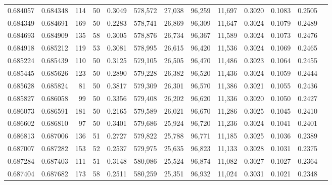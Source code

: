 \begin{tabular}{rrrrrrrrrrrrr}
0.684057 & 0.684348 &   114 &  50 &                                     0.3049 & 578,572 &  27,038 &  96,259 &  11,697 & 0.3020 & 0.1083 & 0.2505 \\
0.684349 & 0.684691 &   169 &  50 &                                     0.2283 & 578,741 &  26,869 &  96,309 &  11,647 & 0.3024 & 0.1079 & 0.2489 \\
0.684693 & 0.684909 &   135 &  58 &                                     0.3005 & 578,876 &  26,734 &  96,367 &  11,589 & 0.3024 & 0.1073 & 0.2476 \\
0.684918 & 0.685212 &   119 &  53 &                                     0.3081 & 578,995 &  26,615 &  96,420 &  11,536 & 0.3024 & 0.1069 & 0.2465 \\
0.685224 & 0.685439 &   110 &  50 &                                     0.3125 & 579,105 &  26,505 &  96,470 &  11,486 & 0.3023 & 0.1064 & 0.2455 \\
0.685445 & 0.685626 &   123 &  50 &                                     0.2890 & 579,228 &  26,382 &  96,520 &  11,436 & 0.3024 & 0.1059 & 0.2444 \\
0.685628 & 0.685824 &    81 &  50 &                                     0.3817 & 579,309 &  26,301 &  96,570 &  11,386 & 0.3021 & 0.1055 & 0.2436 \\
0.685827 & 0.686058 &    99 &  50 &                                     0.3356 & 579,408 &  26,202 &  96,620 &  11,336 & 0.3020 & 0.1050 & 0.2427 \\
0.686073 & 0.686591 &   181 &  50 &                                     0.2165 & 579,589 &  26,021 &  96,670 &  11,286 & 0.3025 & 0.1045 & 0.2410 \\
0.686602 & 0.686810 &    97 &  50 &                                     0.3401 & 579,686 &  25,924 &  96,720 &  11,236 & 0.3024 & 0.1041 & 0.2401 \\
0.686813 & 0.687006 &   136 &  51 &                                     0.2727 & 579,822 &  25,788 &  96,771 &  11,185 & 0.3025 & 0.1036 & 0.2389 \\
0.687007 & 0.687282 &   153 &  52 &                                     0.2537 & 579,975 &  25,635 &  96,823 &  11,133 & 0.3028 & 0.1031 & 0.2375 \\
0.687284 & 0.687403 &   111 &  51 &                                     0.3148 & 580,086 &  25,524 &  96,874 &  11,082 & 0.3027 & 0.1027 & 0.2364 \\
0.687404 & 0.687682 &   173 &  58 &                                     0.2511 & 580,259 &  25,351 &  96,932 &  11,024 & 0.3031 & 0.1021 & 0.2348 \\

\end{tabular}
